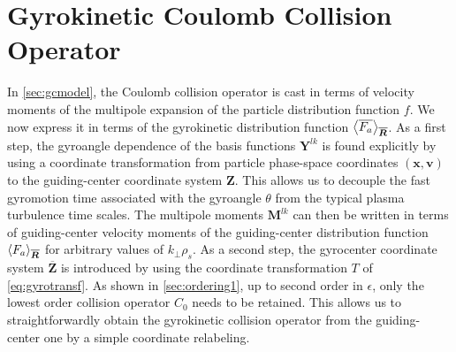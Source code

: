 \section{Gyrokinetic Coulomb Collision Operator}
\label{sec:gudingcentertransf}

In \cref{sec:gcmodel}, the Coulomb collision operator is cast in terms of velocity moments of the multipole expansion of the particle distribution function $f$.
%
We now express it in terms of the gyrokinetic distribution function $\left< \overline{F_a} \right>_{\overline{\bm{R}}}$.
%
As a first step, the gyroangle dependence of the basis functions $\mathbf Y^{lk}$ is found explicitly by using a coordinate transformation from particle phase-space coordinates $(\mathbf x, \mathbf v)$  to the guiding-center coordinate system $\mathbf Z$.
%
This allows us to decouple the fast gyromotion time associated with the gyroangle $\theta$ from the typical plasma turbulence time scales.
%
The multipole moments $\mathbf M^{lk}$ can then be written in terms of guiding-center velocity moments of the guiding-center distribution function $\left< F_a \right>_{\overline{\bm{R}}}$ for arbitrary values of $k_\perp \rho_s$.
%
As a second step, the gyrocenter coordinate system $\overline{\mathbf Z}$ is introduced by using the coordinate transformation $T$ of \cref{eq:gyrotransf}.
%
As shown in \cref{sec:ordering1}, up to second order in $\epsilon$, only the lowest order collision operator $C_0$ needs to be retained.
%
This allows us to straightforwardly obtain the gyrokinetic collision operator from the guiding-center one by a simple coordinate relabeling.

